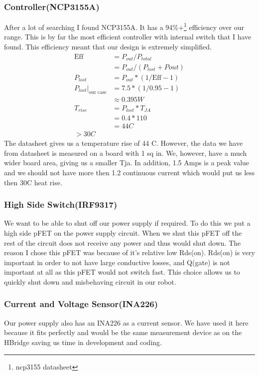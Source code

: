 \documentclass[12pt]{article}
\begin{document}
\subsubsection{Controller(NCP3155A)}
After a lot of searching I found NCP3155A. It has a 94\%+\footnote{ncp3155 datasheet} efficiency over our range. This is by far the most efficient controller with internal switch that I have found. This efficiency meant that our design is extremely simplified.
\begin{align}
\text{Eff} &= P_{out} / P_{total}
\\&= P_{out} / (P_{lost} + P{out})
\\ P_{lost} &= P_{out} * (1/\text{Eff} - 1)
\\ P_{lost}|_{\text{our case}} &=  7.5 * (1/0.95 -1)
\\ &\approx 0.395 W
\\ T_{rise} &= P_{lost} * T_{JA}
\\  &= 0.4 * 110
\\  &= 44 C
\\ >30C
\end{align}
The datasheet gives us a temperature rise of 44 C. However, the data we have from datasheet is measured on a board with 1 sq in. We, however, have a much wider board area, giving us a smaller Tja. In addition, 1.5 Amps is a peak value and we should not have more then 1.2 continuous current which would put us less then 30C heat rise. 
\subsubsection{High Side Switch(IRF9317)}
We want to be able to shut off our power supply if required. To do this we put a high side pFET on the power supply circuit. When we shut this pFET off the rest of the circuit does not receive any power and thus would shut down. The reason I chose this pFET was because of it's relative low Rds(on). Rds(on) is very important in order to not have large conductive losses, and Q(gate) is not important at all as this pFET would not switch fast. This choice allows us to quickly shut down and misbehaving circuit in our robot.
\subsubsection{Current and Voltage Sensor(INA226)}
Our power supply also has an INA226 as a current sensor. We have used it here because it fits perfectly and would be the same measurement device as on the HBridge saving us time in development and coding. 
\end{document}
